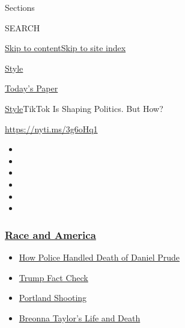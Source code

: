Sections

SEARCH

\protect\hyperlink{site-content}{Skip to
content}\protect\hyperlink{site-index}{Skip to site index}

\href{https://www.nytimes3xbfgragh.onion/section/style}{Style}

\href{https://myaccount.nytimes3xbfgragh.onion/auth/login?response_type=cookie\&client_id=vi}{}

\href{https://www.nytimes3xbfgragh.onion/section/todayspaper}{Today's
Paper}

\href{/section/style}{Style}\textbar{}TikTok Is Shaping Politics. But
How?

\url{https://nyti.ms/3g6oHq1}

\begin{itemize}
\item
\item
\item
\item
\item
\item
\end{itemize}

\hypertarget{race-and-america}{%
\subsubsection{\texorpdfstring{\href{https://www.nytimes3xbfgragh.onion/news-event/george-floyd-protests-minneapolis-new-york-los-angeles?name=styln-george-floyd\&region=TOP_BANNER\&block=storyline_menu_recirc\&action=click\&pgtype=Article\&impression_id=9ca56230-f1cf-11ea-bed1-dd85a44a6708\&variant=undefined}{Race
and America}}{Race and America}}\label{race-and-america}}

\begin{itemize}
\tightlist
\item
  \href{https://www.nytimes3xbfgragh.onion/2020/09/04/nyregion/rochester-police-daniel-prude.html?name=styln-george-floyd\&region=TOP_BANNER\&block=storyline_menu_recirc\&action=click\&pgtype=Article\&impression_id=9ca56231-f1cf-11ea-bed1-dd85a44a6708\&variant=undefined}{How
  Police Handled Death of Daniel Prude}
\item
  \href{https://www.nytimes3xbfgragh.onion/2020/09/01/us/politics/trump-fact-check-protests.html?name=styln-george-floyd\&region=TOP_BANNER\&block=storyline_menu_recirc\&action=click\&pgtype=Article\&impression_id=9ca56232-f1cf-11ea-bed1-dd85a44a6708\&variant=undefined}{Trump
  Fact Check}
\item
  \href{https://www.nytimes3xbfgragh.onion/2020/08/30/us/portland-shooting-explained.html?name=styln-george-floyd\&region=TOP_BANNER\&block=storyline_menu_recirc\&action=click\&pgtype=Article\&impression_id=9ca56233-f1cf-11ea-bed1-dd85a44a6708\&variant=undefined}{Portland
  Shooting}
\item
  \href{https://www.nytimes3xbfgragh.onion/2020/08/30/us/breonna-taylor-police-killing.html?name=styln-george-floyd\&region=TOP_BANNER\&block=storyline_menu_recirc\&action=click\&pgtype=Article\&impression_id=9ca56234-f1cf-11ea-bed1-dd85a44a6708\&variant=undefined}{Breonna
  Taylor's Life and Death}
\end{itemize}

